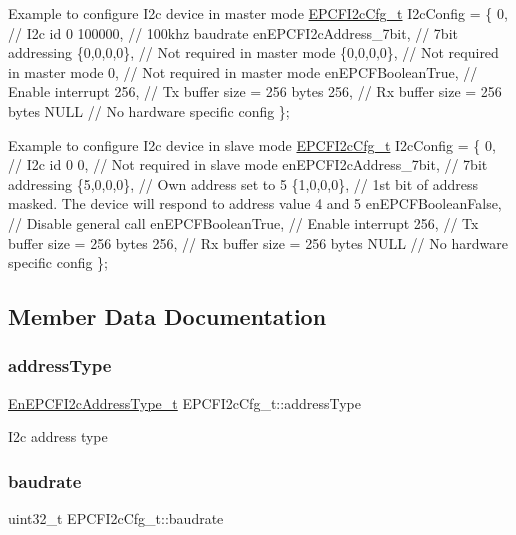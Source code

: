 Example to configure I2c device in master mode \mbox{\hyperlink{structEPCFI2cCfg__t}{E\+P\+C\+F\+I2c\+Cfg\+\_\+t}} I2c\+Config = \{ 0, // I2c id 0 100000, // 100khz baudrate en\+E\+P\+C\+F\+I2c\+Address\+\_\+7bit, // 7bit addressing \{0,0,0,0\}, // Not required in master mode \{0,0,0,0\}, // Not required in master mode 0, // Not required in master mode en\+E\+P\+C\+F\+Boolean\+True, // Enable interrupt 256, // Tx buffer size = 256 bytes 256, // Rx buffer size = 256 bytes N\+U\+LL // No hardware specific config \};

Example to configure I2c device in slave mode \mbox{\hyperlink{structEPCFI2cCfg__t}{E\+P\+C\+F\+I2c\+Cfg\+\_\+t}} I2c\+Config = \{ 0, // I2c id 0 0, // Not required in slave mode en\+E\+P\+C\+F\+I2c\+Address\+\_\+7bit, // 7bit addressing \{5,0,0,0\}, // Own address set to 5 \{1,0,0,0\}, // 1st bit of address masked. The device will respond to address value 4 and 5 en\+E\+P\+C\+F\+Boolean\+False, // Disable general call en\+E\+P\+C\+F\+Boolean\+True, // Enable interrupt 256, // Tx buffer size = 256 bytes 256, // Rx buffer size = 256 bytes N\+U\+LL // No hardware specific config \}; 

\subsection{Member Data Documentation}
\mbox{\label{structEPCFI2cCfg__t_a077674811c9aca0ae9f04d3fd083f715}} 
\subsubsection{\texorpdfstring{address\+Type}{addressType}}
{\footnotesize\ttfamily \mbox{\hyperlink{i2c_8h_a9bc5b2ac9d948097d750f5a4f570ad44}{En\+E\+P\+C\+F\+I2c\+Address\+Type\+\_\+t}} E\+P\+C\+F\+I2c\+Cfg\+\_\+t\+::address\+Type}

I2c address type \mbox{\label{structEPCFI2cCfg__t_a4c5b7780c549be941a235d94b7b87820}} 
\subsubsection{\texorpdfstring{baudrate}{baudrate}}
{\footnotesize\ttfamily uint32\+\_\+t E\+P\+C\+F\+I2c\+Cfg\+\_\+t\+::baudrate}

